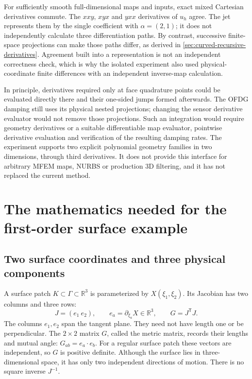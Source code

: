 For sufficiently smooth full-dimensional maps and inputs, exact mixed
Cartesian derivatives commute. The $xxy$, $xyx$ and $yxx$ derivatives of
$u_h$ agree. The jet represents them by the single coefficient with
$\alpha=(2,1)$; it does not independently calculate three differentiation
paths. By contrast, successive finite-space projections can make those
paths differ, as derived in \cref{sec:curved-recursive-derivatives}.
Agreement built into a representation is not an independent correctness
check, which is why the isolated experiment also used physical-coordinate
finite differences with an independent inverse-map calculation.

In principle, derivatives required only at face quadrature points could be
evaluated directly there and their one-sided jumps formed afterwards.
The OFDG damping still uses its physical nested projections; changing the
sensor derivative evaluator would not remove those projections. Such an
integration would require geometry derivatives or a suitable differentiable
map evaluator, pointwise derivative evaluation and verification of the
resulting damping rates. The experiment supports two explicit polynomial
geometry families in two dimensions, through third derivatives. It does not
provide this interface for arbitrary MFEM maps, NURBS or production 3D
filtering, and it has not replaced the current method.

\section{The mathematics needed for the first-order surface example}
\label{sec:appendix-surface}

\subsection{Two surface coordinates and three physical components}
A surface patch $K\subset\Gamma\subset\mathbb R^3$ is parameterized by
$X(\xi_1,\xi_2)$. Its Jacobian has two columns and three rows:
\begin{equation}
 J=(e_1\ e_2),\qquad e_a=\partial_{\xi_a}X\in\mathbb R^3,
 \qquad G=J^{\mathsf T}J.
 \label{eq:app-surface-metric}
\end{equation}
The columns $e_1,e_2$ span the tangent plane. They need not have length one
or be perpendicular. The $2\times2$ matrix $G$, called the metric matrix,
records their lengths and mutual angle: $G_{ab}=e_a\cdot e_b$. For a
regular surface patch these vectors are independent, so $G$ is positive
definite. Although the surface lies in three-dimensional space, it has only
two independent directions of motion. There is no square inverse $J^{-1}$.

